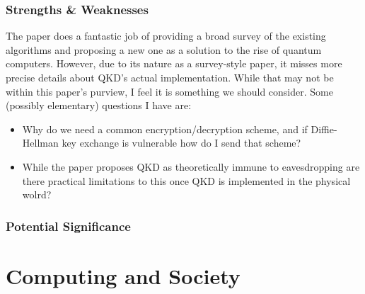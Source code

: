 \documentclass{article}
\begin{document}
\subsubsection*{Strengths \& Weaknesses}
The paper does a fantastic job of providing a broad survey of the existing algorithms and proposing a new one as a solution to the rise 
of quantum computers. However, due to its nature as a survey-style paper, it misses more precise details about QKD's actual implementation.
While that may not be within this paper's purview, I feel it is something we should consider. Some (possibly elementary) questions I have are:
\begin{itemize}
    \item Why do we need a common encryption/decryption scheme, and if Diffie-Hellman key exchange is vulnerable how do I send that scheme?
    \item While the paper proposes QKD as theoretically immune to eavesdropping are there practical limitations to this once QKD is implemented in the physical wolrd?
\end{itemize}

\subsubsection*{Potential Significance}

\section{Computing and Society}

\end{document}
